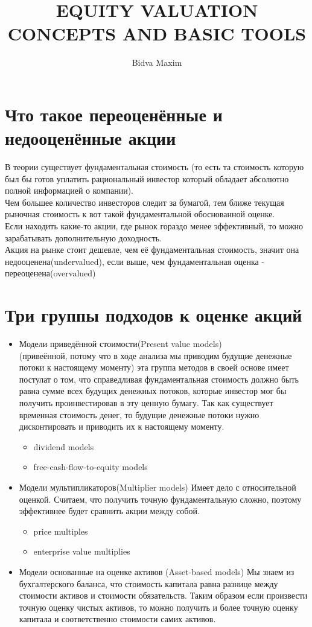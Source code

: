 \documentclass{article}
\title{EQUITY VALUATION CONCEPTS AND BASIC TOOLS}
\author{Bidva Maxim}
\begin{document}
\maketitle
\tableofcontents
\newpage
\section{Что такое переоценённые и недооценённые акции}
В теории существует фундаментальная стоимость (то есть та стоимость которую
был бы готов уплатить рациональный инвестор который обладает абсолютно полной информацией о компании).\\
Чем большее количество инвесторов следит за бумагой, тем ближе текущая рыночная стоимость к вот такой фундаментальной обоснованной оценке.\\
Если находить какие-то акции, где рынок гораздо менее эффективный, то можно зарабатывать дополнительную доходность.\\
Акция на рынке стоит  дешевле, чем её фундаментальная стоимость, значит она недооценена(undervalued), если выше, чем фундаментальная оценка - переоценена(overvalued)

\section{Три группы подходов к оценке акций}
\begin{itemize}
    \item Модели приведённой стоимости(Present value models)\\
(привеённой, потому что в ходе анализа мы приводим будущие денежные потоки к настоящему моменту)
 эта группа методов в своей основе имеет постулат о том, что справедливая фундаментальная стоимость должно быть равна сумме всех будущих денежных потоков, которые инвестор мог бы получить проинвестировав в эту ценную бумагу.
  Так как существует временная стоимость денег, то будущие денежные потоки нужно дисконтировать и приводить их к настоящему моменту.
  \begin{itemize}
    \item dividend models
    \item free-cash-flow-to-equity models
  \end{itemize}
\item Модели мультипликаторов(Multiplier models)
Имеет дело с относительной оценкой. Считаем, что получить точную фундаментальную сложно, поэтому эффективнее будет сравнить акции между собой.
\begin{itemize}
 \item price multiples
 \item enterprise value multiplies
\end{itemize}
\item Модели основанные на оценке активов (Asset-based models)
Мы знаем из бухгалтерского баланса, что стоимость капитала равна разнице между стоимости активов и стоимости обязательств. Таким образом если произвести точную оценку чистых активов, то можно получить и более точную оценку капитала и соответственно стоимости самих активов.
\end{itemize}
\end{document}
